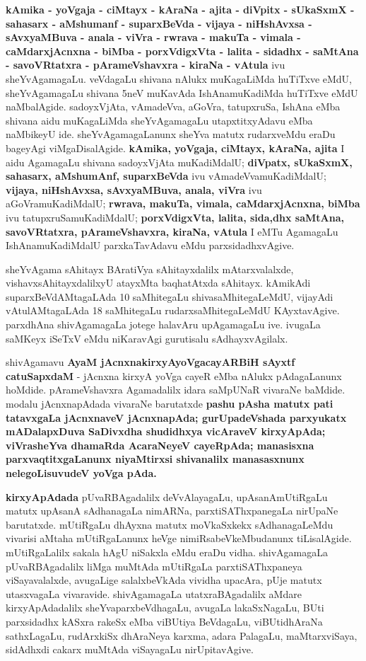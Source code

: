 \textbf{kAmika - yoVgaja - ciMtayx - kAraNa - ajita - diVpitx - sUkaSxmX - sahasarx - aMshumanf - suparxBeVda - vijaya - niHshAvxsa - sAvxyaMBuva - anala - viVra - rwrava - makuTa - vimala - caMdarxjAcnxna - biMba - porxVdigxVta - lalita - sidadhx - saMtAna - savoVRtatxra - pArameVshavxra - kiraNa - vAtula} ivu sheYvAgamagaLu. veVdagaLu shivana nAlukx muKagaLiMda huTiTxve eMdU, sheYvAgamagaLu shivana 5neV muKavAda IshAnamuKadiMda huTiTxve eMdU naMbalAgide. sadoyxVjAta, vAmadeVva, aGoVra, tatupxruSa, IshAna eMba shivana aidu muKagaLiMda sheYvAgamagaLu utapxtitxyAdavu eMba naMbikeyU ide. sheYvAgamagaLanunx sheYva matutx rudarxveMdu eraDu bageyAgi viMgaDisalAgide. \textbf{kAmika, yoVgaja, ciMtayx, kAraNa, ajita} I aidu AgamagaLu shivana sadoyxVjAta muKa\-diMdalU; \textbf{diVpatx, sUkaSxmX, sahasarx, aMshumAnf, suparxBeVda} ivu vAmadeVvamuKadiMdalU; \textbf{vijaya, niHshAvxsa, sAvxyaMBuva, anala, viVra} ivu aGoVramuKadiMdalU; \textbf{rwrava, makuTa, vimala, caMdarxjAcnxna, biMba} ivu tatupxruSamuKadiMdalU; \textbf{porxVdigxVta, lalita, sida,dhx saMtAna, savoVRtatxra, pArameVshavxra, kiraNa, vAtula} I eMTu AgamagaLu IshAnamuKadiMdalU parxkaTavAdavu eMdu parxsidadhxvAgive.

sheYvAgama sAhitayx BAratiVya sAhitayxdalilx mAtarxvalalxde, vishavxsAhitayxdalilxyU atayxMta baqhatAtxda sAhitayx. kAmikAdi suparxBeVdAMtagaLAda 10 saMhitegaLu shivasaMhitegaLeMdU, vijayAdi vAtulAMtagaLAda 18 saMhitegaLu rudarxsaMhitegaLeMdU KAyxta\-vAgive. parxdhAna shivAgamagaLa jotege halavAru upAgamagaLu ive. ivugaLa saMKeyx iSeTxV eMdu niKaravAgi gurutisalu sAdhayxvAgilalx.

shivAgamavu \textbf{AyaM jAcnxnakirxyAyoVgacayARBiH sAyxtf catuSapxdaM} - jAcnxna kirxyA yoVga cayeR eMba nAlukx pAdagaLanunx hoMdide. pArameVshavxra Agamadalilx idara saMpUNaR vivaraNe baMdide. modalu jAcnxnapAdada vivaraNe barutatxde \textbf{pashu pAsha matutx pati tatavxgaLa jAcnxnaveV jAcnxnapAda; gurUpadeVshada parxyukatx mADalapxDuva SaDivxdha shudidhxya vicAraveV kirxyApAda; viVrasheYva dhamaRda AcaraNeyeV cayeRpAda; manasisxna parxvaqtitxgaLanunx niyaMtirxsi shivanalilx manasasxnunx nelegoLisuvudeV yoVga pAda.}

\textbf{kirxyApAdada} pUvaRBAgadalilx deVvAlayagaLu, upAsanAmUtiRgaLu matutx upAsanA sAdhanagaLa nimARNa, parxtiSAThxpanegaLa nirUpaNe barutatxde. mUtiRgaLu dhAyxna matutx moVkaSxkekx sAdhanagaLeMdu vivarisi aMtaha mUtiRgaLanunx heVge nimiRsabeVkeMbudanunx tiLisalAgide. mUtiRgaLalilx sakala hAgU niSakxla eMdu eraDu vidha. shivAgamagaLa pUvaRBAgadalilx liMga muMtAda mUtiRgaLa parxtiSAThxpaneya viSayavalalxde, avugaLige salalxbeVkAda vividha upacAra, pUje matutx utasxvagaLa vivara\-vide. shivAgamagaLa utatxraBAgadalilx aMdare kirxyApAdadalilx sheYvaparxbeVdhagaLu, avugaLa lakaSxNagaLu, BUti parxsidadhx kASxra rakeSx eMba viBUtiya BeVdagaLu, viBUtidhAraNa sathxLagaLu, rudArxkiSx dhAraNeya karxma, adara PalagaLu, maMtarxviSaya, sidAdhxdi cakarx muMtAda viSayagaLu nirUpitavAgive.

